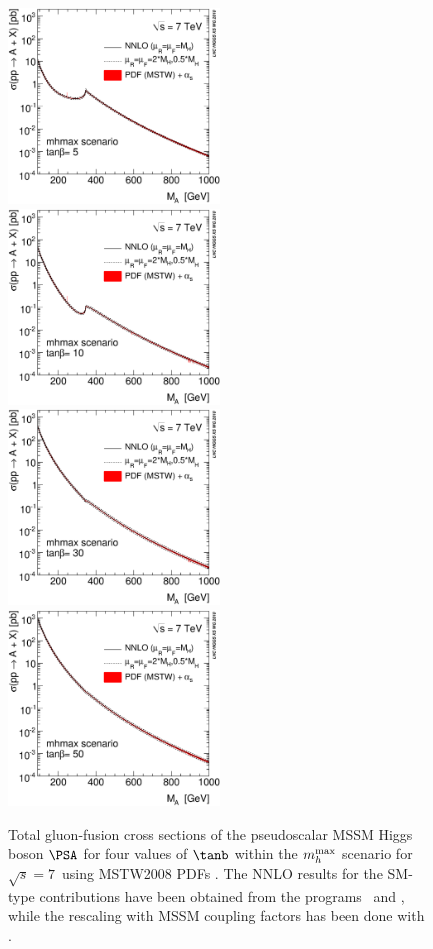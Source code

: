 \begin{figure}[htb]
\includegraphics[width=0.5\textwidth]{YRHXS_MSSM_neutral/YRHXS_MSSM_neutral_fig1a.eps}
\includegraphics[width=0.5\textwidth]{YRHXS_MSSM_neutral/YRHXS_MSSM_neutral_fig1b.eps}
\includegraphics[width=0.5\textwidth]{YRHXS_MSSM_neutral/YRHXS_MSSM_neutral_fig1c.eps}
\includegraphics[width=0.5\textwidth]{YRHXS_MSSM_neutral/YRHXS_MSSM_neutral_fig1d.eps}
\caption{\label{YRHXS_MSSM_neutral_fig1} Total gluon-fusion cross
sections of the pseudoscalar MSSM Higgs boson $\PSA$ for four values of
$\tanb$ within the $m_h^{\rm max}$ scenario for $\sqrt{s}=7$\UTeV\ using
MSTW2008 PDFs \cite{Martin:2009iq,Martin:2009bu}. The NNLO results for
the SM-type contributions have been obtained from the programs
\HIGLU~and \gghnnlo, while the rescaling with MSSM coupling factors has
been done with \FeynHiggs.}
\end{figure}

